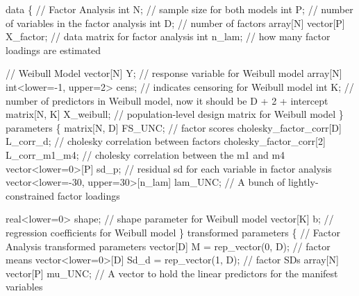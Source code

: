 \documentclass[
  letterpaper,
  DIV=11,
  numbers=noendperiod]{scrreprt}
\newenvironment{Shaded}{\begin{snugshade}}{\end{snugshade}}
\newcommand{\CommentTok}[1]{\textcolor[rgb]{0.37,0.37,0.37}{#1}}
\newcommand{\DataTypeTok}[1]{\textcolor[rgb]{0.68,0.00,0.00}{#1}}
\newcommand{\DecValTok}[1]{\textcolor[rgb]{0.68,0.00,0.00}{#1}}
\newcommand{\KeywordTok}[1]{\textcolor[rgb]{0.00,0.23,0.31}{#1}}
\newcommand{\NormalTok}[1]{\textcolor[rgb]{0.00,0.23,0.31}{#1}}
\begin{document}
\begin{Shaded}
\begin{Highlighting}[]
\KeywordTok{data}\NormalTok{ \{}
  \CommentTok{// Factor Analysis}
  \DataTypeTok{int}\NormalTok{ N; }\CommentTok{// sample size for both models}
  \DataTypeTok{int}\NormalTok{ P; }\CommentTok{// number of variables in the factor analysis}
  \DataTypeTok{int}\NormalTok{ D; }\CommentTok{// number of factors}
  \DataTypeTok{array}\NormalTok{[N] }\DataTypeTok{vector}\NormalTok{[P] X\_factor; }\CommentTok{// data matrix for factor analysis}
  \DataTypeTok{int}\NormalTok{ n\_lam; }\CommentTok{// how many factor loadings are estimated}
  
  \CommentTok{// Weibull Model}
  \DataTypeTok{vector}\NormalTok{[N] Y; }\CommentTok{// response variable for Weibull model}
  \DataTypeTok{array}\NormalTok{[N] }\DataTypeTok{int}\NormalTok{\textless{}}\KeywordTok{lower}\NormalTok{={-}}\DecValTok{1}\NormalTok{, }\KeywordTok{upper}\NormalTok{=}\DecValTok{2}\NormalTok{\textgreater{} cens; }\CommentTok{// indicates censoring for Weibull model}
  \DataTypeTok{int}\NormalTok{ K; }\CommentTok{// number of predictors in Weibull model, now it should be D + 2 + intercept}
  \DataTypeTok{matrix}\NormalTok{[N, K] X\_weibull; }\CommentTok{// population{-}level design matrix for Weibull model}
\NormalTok{\}}
\KeywordTok{parameters}\NormalTok{ \{}
  \DataTypeTok{matrix}\NormalTok{[N, D] FS\_UNC; }\CommentTok{// factor scores}
  \DataTypeTok{cholesky\_factor\_corr}\NormalTok{[D] L\_corr\_d; }\CommentTok{// cholesky correlation between factors}
  \DataTypeTok{cholesky\_factor\_corr}\NormalTok{[}\DecValTok{2}\NormalTok{] L\_corr\_m1\_m4; }\CommentTok{// cholesky correlation between the m1 and m4}
  \DataTypeTok{vector}\NormalTok{\textless{}}\KeywordTok{lower}\NormalTok{=}\DecValTok{0}\NormalTok{\textgreater{}[P] sd\_p; }\CommentTok{// residual sd for each variable in factor analysis}
  \DataTypeTok{vector}\NormalTok{\textless{}}\KeywordTok{lower}\NormalTok{={-}}\DecValTok{30}\NormalTok{, }\KeywordTok{upper}\NormalTok{=}\DecValTok{30}\NormalTok{\textgreater{}[n\_lam] lam\_UNC; }\CommentTok{// A bunch of lightly{-}constrained factor loadings}
  
  \DataTypeTok{real}\NormalTok{\textless{}}\KeywordTok{lower}\NormalTok{=}\DecValTok{0}\NormalTok{\textgreater{} shape; }\CommentTok{// shape parameter for Weibull model}
  \DataTypeTok{vector}\NormalTok{[K] b; }\CommentTok{// regression coefficients for Weibull model}
\NormalTok{\}}
\KeywordTok{transformed parameters}\NormalTok{ \{}
  \CommentTok{// Factor Analysis transformed parameters}
  \DataTypeTok{vector}\NormalTok{[D] M = rep\_vector(}\DecValTok{0}\NormalTok{, D); }\CommentTok{// factor means}
  \DataTypeTok{vector}\NormalTok{\textless{}}\KeywordTok{lower}\NormalTok{=}\DecValTok{0}\NormalTok{\textgreater{}[D] Sd\_d = rep\_vector(}\DecValTok{1}\NormalTok{, D); }\CommentTok{// factor SDs}
  \DataTypeTok{array}\NormalTok{[N] }\DataTypeTok{vector}\NormalTok{[P] mu\_UNC; }\CommentTok{// A vector to hold the linear predictors for the manifest variables}


\end{Highlighting}
\end{Shaded}
\end{document}
